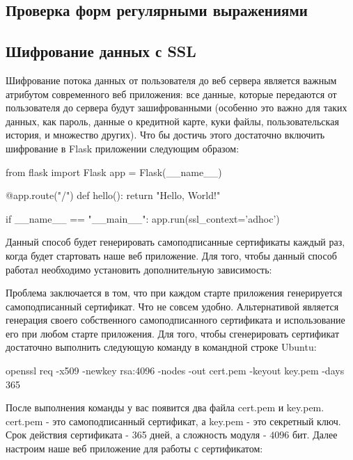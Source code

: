 \subsection{Проверка форм регулярными выражениями}

\subsection{Шифрование данных с SSL}

Шифрование потока данных от пользователя до веб сервера является важным атрибутом
современного веб приложения: все данные, которые передаются от пользователя до сервера
будут зашифрованными (особенно это важно для таких данных, как пароль, данные о кредитной карте, куки файлы, 
пользовательская история, и множество других). Что бы достичь этого достаточно включить
шифрование в Flask приложении следующим образом:

\begin{python}
from flask import Flask
app = Flask(__name__)

@app.route("/")
def hello():
    return "Hello, World!"

if __name__ == "__main__":
    app.run(ssl_context='adhoc')
\end{python}

Данный способ будет генерировать самоподписанные сертификаты каждый раз, когда будет
стартовать наше веб приложение. Для того, чтобы данный способ работал необходимо установить
дополнительную зависимость:


Проблема заключается в том, что при каждом старте приложения генерируется самоподписанный 
сертификат. Что не совсем удобно. Альтернативой является генерация своего собственного 
самоподписанного сертификата и использование его при любом старте приложения. Для того,
чтобы сгенерировать сертификат достаточно выполнить следующую команду в командной строке
Ubuntu:

\begin{python}
openssl req -x509 -newkey rsa:4096 -nodes -out cert.pem -keyout key.pem -days 365
\end{python}

После выполнения команды у вас появится два файла cert.pem и key.pem. cert.pem - это
самоподписанный сертификат, а key.pem - это секретный ключ. Срок действия сертификата - 
365 дней, а сложность модуля - $4096$ бит. Далее настроим наше веб приложение для работы 
с сертификатом:

